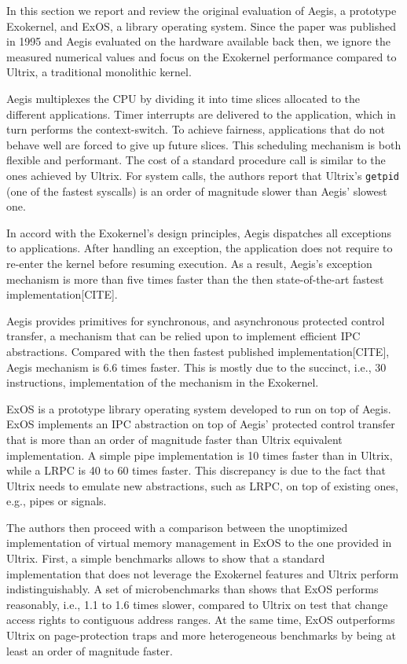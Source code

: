 
In this section we report and review the original evaluation of Aegis, a prototype Exokernel, and ExOS, a library operating system.
Since the paper was published in 1995 and Aegis evaluated on the hardware available back then, we ignore the measured numerical values and focus on the Exokernel performance compared to Ultrix, a traditional monolithic kernel.

Aegis multiplexes the CPU by dividing it into time slices allocated to the different applications.
Timer interrupts are delivered to the application, which in turn performs the context-switch.
To achieve fairness, applications that do not behave well are forced to give up future slices.
This scheduling mechanism is both flexible and performant.
The cost of a standard procedure call is similar to the ones achieved by Ultrix.
For system calls, the authors report that Ultrix's \lstinline{getpid} (one of the fastest syscalls) is an order of magnitude slower than Aegis' slowest one.

In accord with the Exokernel's design principles, Aegis dispatches all exceptions to applications.
After handling an exception, the application does not require to re-enter the kernel before resuming execution.
As a result, Aegis's exception mechanism is more than five times faster than the then state-of-the-art fastest implementation[CITE].

Aegis provides primitives for synchronous, and asynchronous protected control transfer, a mechanism that can be relied upon to implement efficient IPC abstractions.
Compared with the then fastest published implementation[CITE], Aegis mechanism is 6.6 times faster.
This is mostly due to the succinct, i.e., 30 instructions, implementation of the mechanism in the Exokernel.

ExOS is a prototype library operating system developed to run on top of Aegis.
ExOS implements an IPC abstraction on top of Aegis' protected control transfer that is more than an order of magnitude faster than Ultrix equivalent implementation.
A simple pipe implementation is 10 times faster than in Ultrix, while a LRPC is 40 to 60 times faster.
This discrepancy is due to the fact that Ultrix needs to emulate new abstractions, such as LRPC, on top of existing ones, e.g., pipes or signals.

The authors then proceed with a comparison between the unoptimized implementation of virtual memory management in ExOS to the one provided in Ultrix.
First, a simple benchmarks allows to show that a standard implementation that does not leverage the Exokernel features and Ultrix perform indistinguishably.
A set of microbenchmarks than shows that ExOS performs reasonably, i.e., 1.1 to 1.6 times slower, compared to Ultrix on test that change access rights to contiguous address ranges.
At the same time, ExOS outperforms Ultrix on page-protection traps and more heterogeneous benchmarks by being at least an order of magnitude faster.